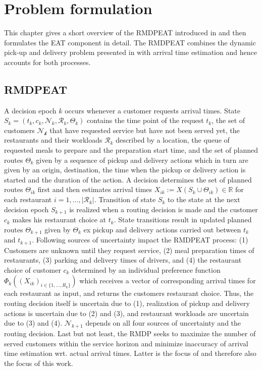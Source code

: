 \chapter{Problem formulation}

This chapter gives a short overview of the RMDPEAT introduced in \cite{Hildebrandt2020_EAT} and then formulates the EAT component in detail. The RMDPEAT combines the dynamic pick-up and delivery problem presented in \cite{UlmerRMDP} with arrival time estimation and hence accounts for both processes.  

\section{RMDPEAT} 


A decision epoch $ k $ occurs whenever a customer requests arrival times. 
State $ S_k = (t_k, c_k, \mathcal{N}_k, \mathcal{R}_k, \Theta_k)$ contains the time point of the request $ t_k $, the set of customers $ \mathcal{N_k} $ that have requested service but have not been served yet, the restaurants and their workloads $ \mathcal{R}_k $ described by a location, the queue of requested meals to prepare and the preparation start time, and the set of planned routes $ \Theta_k $ given by a sequence of pickup and delivery actions which in turn are given by an origin, destination, the time when the pickup or delivery action is started and the duration of the action. 
A decision determines the set of planned routes $ \Theta_{ik} $ first and then estimates arrival times $ X_{ik} := X (S_k \cup \Theta_{ik}) \in \mathbb{R}$ for each restaurant $ i = 1, \dots, |\mathcal{R}_k| $.
Transition of state $ S_k $ to the state at the next decision epoch $ S_{k+1} $ is realized when a routing decision is made and the customer $ c_k $ makes his restaurant choice at $ t_k $. State transitions result in updated planned routes $ \Theta_{k+1} $ given by $ \Theta_k $ ex pickup and delivery actions carried out between $ t_k $ and $ t_{k+1} $. Following sources of uncertainty impact the RMDPEAT process: (1) Customers are unknown until they request service, (2) meal preparation times of restaurants, (3) parking and delivery times of drivers, and (4) the restaurant choice of customer $ c_k $ determined by an individual preference function $ \Phi_k((X_{ik})_{i \in \{1,\dots, R_k\}}) $ which receives a vector of corresponding arrival times for each restaurant as input, and returns the customers restaurant choice. Thus, the routing decision itself is uncertain due to (1), realization of pickup and delivery actions is uncertain due to (2) and (3), and restaurant workloads are uncertain due to (3) and (4). $ \mathcal{N}_{k+1} $ depends on all four sources of uncertainty and the routing decision.
Last but not least, the RMDP seeks to maximize the number of served customers within the service horizon and minimize inaccuracy of arrival time estimation wrt. actual arrival times. Latter is the focus of \cite{Hildebrandt2020_EAT} and therefore also the focus of this work.
 
